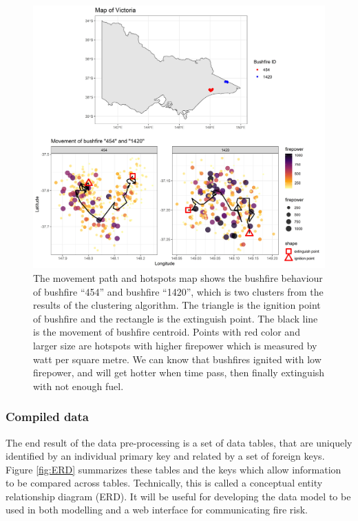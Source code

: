 \documentclass[11pt,a4paper,]{article}
\begin{document}
\begin{figure}
\centering
\includegraphics[width=5.20833in,height=\textheight]{figures/fire_mov.jpg}
\caption{The movement path and hotspots map shows the bushfire behaviour of bushfire ``454'' and bushfire ``1420'', which is two clusters from the results of the clustering algorithm. The triangle is the ignition point of bushfire and the rectangle is the extinguish point. The black line is the movement of bushfire centroid. Points with red color and larger size are hotspots with higher firepower which is measured by watt per square metre. We can know that bushfires ignited with low firepower, and will get hotter when time pass, then finally extinguish with not enough fuel. \label{fig:mov}}
\end{figure}

\hypertarget{compiled-data}{%
\subsubsection{Compiled data}\label{compiled-data}}

The end result of the data pre-processing is a set of data tables, that are uniquely identified by an individual primary key and related by a set of foreign keys. Figure \ref{fig:ERD} summarizes these tables and the keys which allow information to be compared across tables. Technically, this is called a conceptual entity relationship diagram (ERD). It will be useful for developing the data model to be used in both modelling and a web interface for communicating fire risk.
\end{document}

